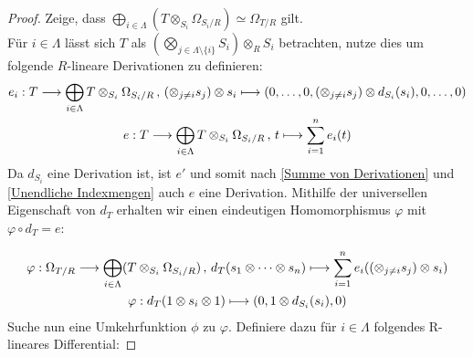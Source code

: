 \documentclass[10pt,a4paper]{report}
\newcommand{\comment}[1]{}
\newcommand{\functionback}[3]{\nolinebreak{#1:#2 \longmapsto #3}}
\newcommand{\function}[5]{\nolinebreak{#1:#2 \longrightarrow #3 \, , \, #4 \longmapsto #5}}
\newcommand{\divR}[2]{\Omega_{#1/#2}}
\newcommand{\divf}[1]{d_{#1}}
\newcommand{\Tensor}[3]{#1 \otimes_{#2} #3}
\newcommand{\tensor}[3]{#1 \otimes #3}
\begin{document}
\begin{proof} Zeige, dass $\bigoplus_{i\in \Lambda} ( \Tensor{T}{S_i}{\divR{S_i}{R}}) \simeq \divR{T}{R}$ gilt.\\
Für $i \in \Lambda$ lässt sich  $T$ als $\Tensor{\left(\bigotimes_{j \in \Lambda \setminus \lbrace i \rbrace} S_i \right)}{R}{S_i}$ betrachten, nutze dies um folgende $R$-lineare Derivationen zu definieren:
\begin{gather*}
\comment{
\function{e_i}{T}{\bigoplus_{i \in \Lambda} \Tensor{T}{S_i}{\divR{S_i}{R}}}{\tensor{(\otimes_{j \neq i} s_j)}{R}{s_i}}{(0,\dots,0,\tensor{(\otimes_{j \neq i} s_j)}{R}{d_{S_i}(s_i)},0,\dots,0)} \\
\function{e}{T}{\bigoplus_{i \in \Lambda} \Tensor{T}{S_i}{\divR{S_i}{R}}}{\tensor{(\otimes_{j \neq i} s_j)}{R}{s_i}}{\sum_{i = 1}^n e_i(\tensor{(\otimes_{j \neq i} s_j)}{R}{s_i})}
}
\function{e_i}{T}{\bigoplus_{i \in \Lambda} \Tensor{T}{S_i}{\divR{S_i}{R}}}{\tensor{(\otimes_{j \neq i} s_j)}{R}{s_i}}{(0,\dots,0,\tensor{(\otimes_{j \neq i} s_j)}{R}{d_{S_i}(s_i)},0,\dots,0)} \\
\function{e}{T}{\bigoplus_{i \in \Lambda} \Tensor{T}{S_i}{\divR{S_i}{R}}}{t}{\sum_{i = 1}^n e_i(t)}
\end{gather*}
Da $\divf{S_i}$ eine Derivation ist, ist $e'$ und somit nach \cref{Summe von Derivationen} und \cref{Unendliche Indexmengen} auch $e$ eine Derivation. Mithilfe der universellen Eigenschaft von $\divf{T}$ erhalten wir einen eindeutigen Homomorphismus $\varphi$ mit $\varphi \circ \divf{T} = e$:
\comment{
\begin{center}
\begin{tikzcd}
T \arrow[rd, "e"'] \arrow[r, "\divf{T}"] & \divR{T}{R} \arrow[d, "\exists ! \varphi", dashed] \\
                                    & \bigoplus_{i\in \Lambda} \Tensor{T}{S_i}{\divR{S_i}{R}}                                       
\end{tikzcd}
\end{center}
}
\begin{gather*}
\function{\varphi}{\divR{T}{R}}{\bigoplus_{i\in \Lambda}(\Tensor{T}{S_i}{\divR{S_i}{R}})}{\divf{T}(s_1 \otimes \dots \otimes s_n)}{\sum_{i = 1}^n e_i(\tensor{(\otimes_{j \neq i} s_j)}{R}{s_i})}\\
\functionback{\varphi}{\divf{T}(1 \otimes s_i \otimes 1)}{(0,\tensor{1}{S_i}{d_{S_i}(s_i)},0)}
\end{gather*}
Suche nun eine Umkehrfunktion $\phi$ zu $\varphi$. Definiere dazu für $i \in \Lambda$ folgendes R-lineares Differential:

\end{proof}
\end{document}
